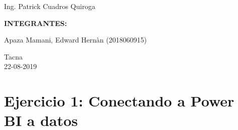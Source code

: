 \documentclass[12pt,letterpaper]{article}
\begin{document}
\begin{titlepage}
\begin{center}
\vspace*{0.1in}
\begin{large}
 Ing. Patrick Cuadros Quiroga\\
\end{large}

\vspace*{0.4in}
\vspace*{0.1in}
\begin{large}
\textbf{INTEGRANTES:} \\
\begin{flushleft}
Apaza Mamani, Edward Hernàn \hfill	(2018060915)\\

\centering  %
\vspace*{0.9in}
\begin{large}
Tacna\\ 22-08-2019
\end{large}

\end{flushleft}
\end{large}
\end{center}

\end{titlepage}


\tableofcontents %
\thispagestyle{empty} %
\newpage
\setcounter{page}{1} %


\section{Ejercicio 1: Conectando a Power BI a datos} 
\end{document}
